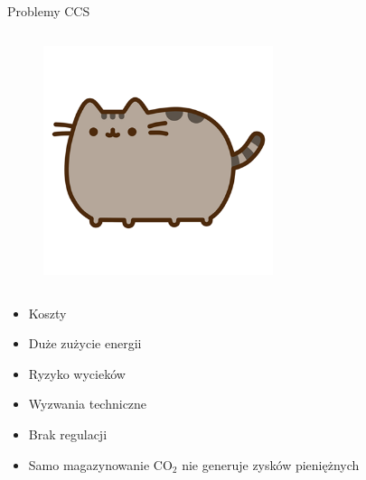 \begin{columnframe}{Problemy CCS}
    \begin{column}{0.5\textwidth}
        \begin{figure}
            \centering
            \includegraphics[width=0.6\textwidth, frame]{images/pusheen.png}
        \end{figure}
    \end{column}
    \begin{column}{0.5\textwidth}
        \begin{itemize}
            \item Koszty
            \item Duże zużycie energii
            \item Ryzyko wycieków
            \item Wyzwania techniczne
            \item Brak regulacji
            \item Samo magazynowanie CO$_2$ nie generuje zysków pieniężnych
        \end{itemize}
    \end{column}
\end{columnframe}